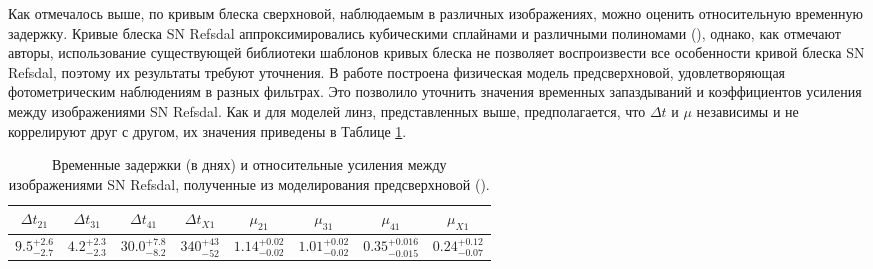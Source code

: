 Как отмечалось выше, по кривым блеска сверхновой, наблюдаемым в различных изображениях, можно оценить относительную временную задержку. Кривые блеска SN Refsdal аппроксимировались кубическими сплайнами и различными полиномами (\cite{rodney2016}), однако, как отмечают авторы, использование существующей библиотеки шаблонов кривых блеска не позволяет воспроизвести все особенности кривой блеска SN Refsdal, поэтому их результаты требуют уточнения. В работе \cite{petrnat2020} построена физическая модель предсверхновой, удовлетворяющая фотометрическим наблюдениям в разных фильтрах. Это позволило уточнить значения временных запаздываний и коэффициентов усиления между изображениями SN Refsdal. Как и для моделей линз, представленных выше, предполагается, что $\Delta t$ и $\mu$ независимы и не коррелируют друг с другом, их значения приведены в Таблице \ref{tab:dtdmpetrnat}.

\begin{table}[H]
 \caption{Временные задержки (в днях) и относительные усиления между изображениями SN Refsdal, полученные из моделирования предсверхновой (\cite{petrnat2020}).}
 \label{tab:dtdmpetrnat}
 \centering
 \begin{tabular}{ | c | c | c | c | c | c | c | c |}
    \hline
    $\Delta t_{21}$ & $\Delta t_{31}$ & $\Delta t_{41}$ & $\Delta t_{X1}$ & $\mu_{21}$ & $\mu_{31}$ & $\mu_{41}$ & $\mu_{X1}$ \\ \hline
    $9.5^{+2.6}_{-2.7}$ & $4.2^{+2.3}_{-2.3}$ & $30.0^{+7.8}_{-8.2}$ & $340^{+43}_{-52}$ &  $1.14^{+0.02}_{-0.02}$ & $1.01^{+0.02}_{-0.02}$ & $0.35^{+0.016}_{-0.015}$ & $0.24^{+0.12}_{-0.07}$  \\ \hline
 \end{tabular}
\end{table}


